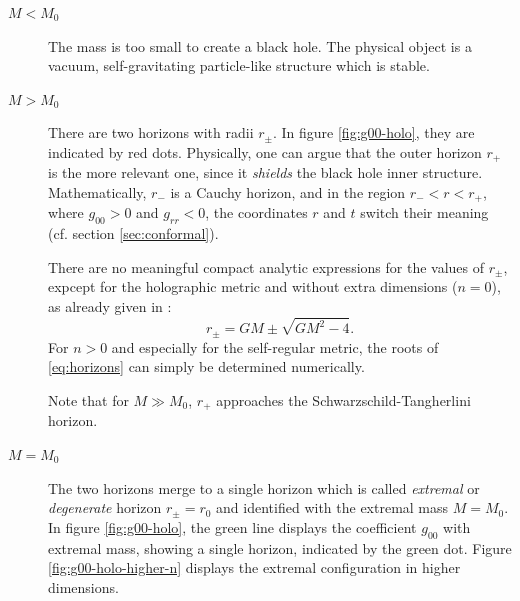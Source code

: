 \documentclass[12pt,a4paper]{report}
\numberwithin{equation}{chapter}
\begin{document}
\begin{description}
\item[$M < M_0$]
The mass is too small to create a black hole. The physical object is a vacuum, self-gravitating particle-like structure which is stable.

\item[$M > M_0$] There are two horizons with radii $r_\pm$. In figure \ref{fig:g00-holo}, they are indicated by red dots. Physically, one can argue that the outer horizon $r_+$ is the more relevant one, since it \emph{shields} the black hole inner structure. Mathematically, $r_-$ is a Cauchy horizon, and in the region $r_- < r < r_+$, where $g_{00}>0$ and $g_{rr}<0$, the coordinates $r$ and $t$ switch their meaning (cf. section \ref{sec:conformal}).

There are no meaningful compact analytic expressions for the values of $r_\pm$, expcept for the holographic metric and without extra dimensions ($n=0$), as already given in \cite{NS2013}:
\begin{equation}
r_\pm = GM \pm \sqrt{G M^2 - 4}.
\end{equation}
For $n>0$ and especially for the self-regular metric, the roots of \eqref{eq:horizons} can simply be determined numerically. %

Note that for $M \gg M_0$, $r_+$ approaches the Schwarzschild-Tangherlini horizon.

\item[$M = M_0$]
The two horizons merge to a single horizon which is called \emph{extremal} or \emph{degenerate} horizon $r_\pm = r_0$ and identified with the extremal mass $M=M_0$. In figure \ref{fig:g00-holo}, the green line displays the coefficient $g_{00}$ with extremal mass, showing a single horizon, indicated by the green dot. Figure \ref{fig:g00-holo-higher-n} displays the extremal configuration in higher dimensions.
\end{description}
%
\end{document}
